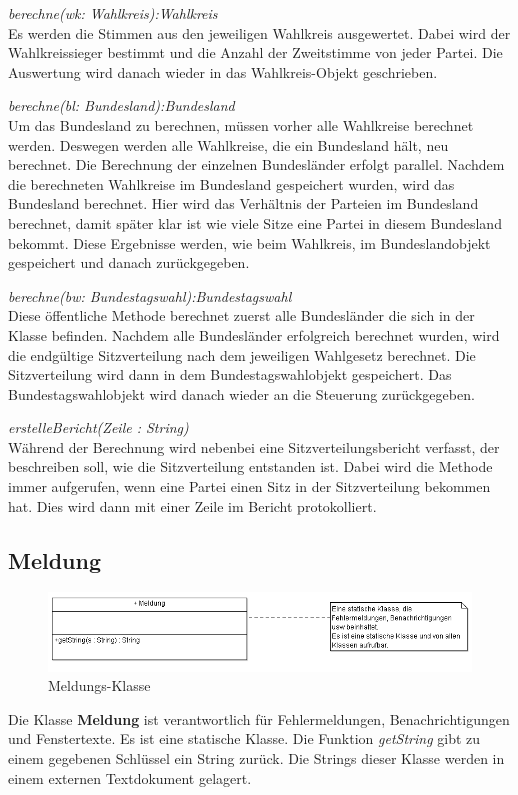 \documentclass[12pt,a4paper,titlepage]{article}
\newcommand{\myma}{\fontfamily{pcr}\selectfont \textbf}
\newcommand{\mymo}{\fontfamily{pcr}\selectfont \textit}
\begin{document}
\begin{description}

\item {\mymo{berechne(wk: Wahlkreis):Wahlkreis}} \\
Es werden die Stimmen aus den jeweiligen Wahlkreis ausgewertet. Dabei wird der Wahlkreissieger bestimmt und die Anzahl der Zweitstimme von jeder Partei. Die Auswertung wird danach wieder in das Wahlkreis-Objekt geschrieben.
\item {\mymo{berechne(bl: Bundesland):Bundesland}} \\
Um das Bundesland zu berechnen, müssen vorher alle Wahlkreise berechnet werden. Deswegen werden alle Wahlkreise, die ein Bundesland hält, neu berechnet. Die Berechnung der einzelnen Bundesländer erfolgt parallel. Nachdem die berechneten Wahlkreise im Bundesland gespeichert wurden, wird das Bundesland berechnet. Hier wird das Verhältnis der Parteien im Bundesland berechnet, damit später klar ist wie viele Sitze eine Partei in diesem Bundesland bekommt. Diese Ergebnisse werden, wie beim Wahlkreis, im Bundeslandobjekt gespeichert und danach zurückgegeben. 
\item {\mymo{berechne(bw: Bundestagswahl):Bundestagswahl}} \\
Diese öffentliche Methode berechnet zuerst alle Bundesländer die sich in der Klasse befinden. Nachdem alle Bundesländer erfolgreich berechnet wurden, wird die endgültige Sitzverteilung nach dem jeweiligen Wahlgesetz berechnet. Die Sitzverteilung wird dann in dem Bundestagswahlobjekt gespeichert. Das Bundestagswahlobjekt wird danach wieder an die Steuerung zurückgegeben.
\item {\mymo{erstelleBericht(Zeile : String)}} \\
Während der Berechnung wird nebenbei eine Sitzverteilungsbericht verfasst, der beschreiben soll, wie die Sitzverteilung entstanden ist. Dabei wird die Methode immer aufgerufen, wenn eine Partei einen Sitz in der Sitzverteilung bekommen hat. Dies wird dann mit einer Zeile im Bericht protokolliert.
\end{description} 

\newpage
\subsection{Meldung}
\begin{figure}[!ht]
\centering
\includegraphics[scale=0.8]{Meldung_Ausschnitt.png} \caption{Meldungs-Klasse} 
\end{figure}
Die Klasse {\myma{Meldung}} ist verantwortlich für Fehlermeldungen, Benachrichtigungen und Fenstertexte. Es ist eine statische Klasse. Die Funktion {\mymo{getString}} gibt zu einem gegebenen Schlüssel ein String zurück. Die Strings dieser Klasse werden in einem externen Textdokument gelagert.
\end{document}
